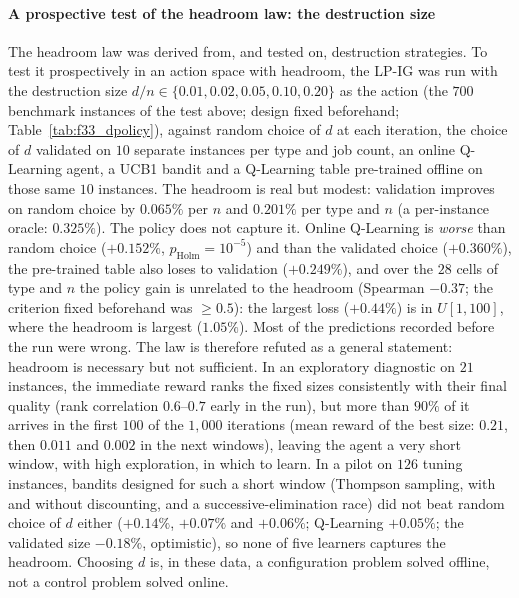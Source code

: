 \documentclass[final,3p,times,11pt,authoryear]{elsarticle}
\begin{document}
\paragraph{A prospective test of the headroom law: the destruction size}
The headroom law was derived from, and tested on, destruction strategies. To test it prospectively in an action space with headroom, the LP-IG was run with the destruction size $d/n\in\{0.01,0.02,0.05,0.10,0.20\}$ as the action (the $700$ benchmark instances of the test above; design fixed beforehand; Table~\ref{tab:f33_dpolicy}), against random choice of $d$ at each iteration, the choice of $d$ validated on $10$ separate instances per type and job count, an online Q-Learning agent, a UCB1 bandit and a Q-Learning table pre-trained offline on those same $10$ instances. The headroom is real but modest: validation improves on random choice by $0.065\%$ per $n$ and $0.201\%$ per type and $n$ (a per-instance oracle: $0.325\%$). The policy does not capture it. Online Q-Learning is \emph{worse} than random choice ($+0.152\%$, $p_{\mathrm{Holm}}=10^{-5}$) and than the validated choice ($+0.360\%$), the pre-trained table also loses to validation ($+0.249\%$), and over the $28$ cells of type and $n$ the policy gain is unrelated to the headroom (Spearman $-0.37$; the criterion fixed beforehand was $\geq0.5$): the largest loss ($+0.44\%$) is in $U[1,100]$, where the headroom is largest ($1.05\%$). Most of the predictions recorded before the run were wrong. The law is therefore refuted as a general statement: headroom is necessary but not sufficient. In an exploratory diagnostic on $21$ instances, the immediate reward ranks the fixed sizes consistently with their final quality (rank correlation $0.6$--$0.7$ early in the run), but more than $90\%$ of it arrives in the first $100$ of the $1{,}000$ iterations (mean reward of the best size: $0.21$, then $0.011$ and $0.002$ in the next windows), leaving the agent a very short window, with high exploration, in which to learn. In a pilot on $126$ tuning instances, bandits designed for such a short window (Thompson sampling, with and without discounting, and a successive-elimination race) did not beat random choice of $d$ either ($+0.14\%$, $+0.07\%$ and $+0.06\%$; Q-Learning $+0.05\%$; the validated size $-0.18\%$, optimistic), so none of five learners captures the headroom. Choosing $d$ is, in these data, a configuration problem solved offline, not a control problem solved online.


\end{document}
